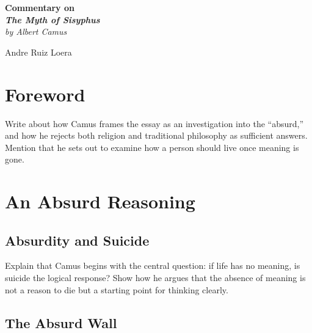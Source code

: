 \documentclass[12pt,letterpaper]{book}
\theoremstyle{definition}
\theoremstyle{remark}
\begin{document}
\begin{titlepage}
\begin{center}

\vspace*{4cm}

{\Huge\bfseries Commentary on}\\[1cm]

{\Huge\bfseries\textit{The Myth of Sisyphus}}\\[0.5cm]

{\large\textit{by Albert Camus}}

\vfill

{\LARGE Andre Ruiz Loera}

\vspace{3cm}

\end{center}
\end{titlepage}

\chapter*{Foreword}

Write about how Camus frames the essay as an investigation into the \enquote{absurd,} and how he rejects both religion and traditional philosophy as sufficient answers. Mention that he sets out to examine how a person should live once meaning is gone.

\clearpage

\tableofcontents
\clearpage

\chapter{An Absurd Reasoning}

\section{Absurdity and Suicide}

Explain that Camus begins with the central question: if life has no meaning, is suicide the logical response? Show how he argues that the absence of meaning is not a reason to die but a starting point for thinking clearly.

\section{The Absurd Wall}
\end{document}
